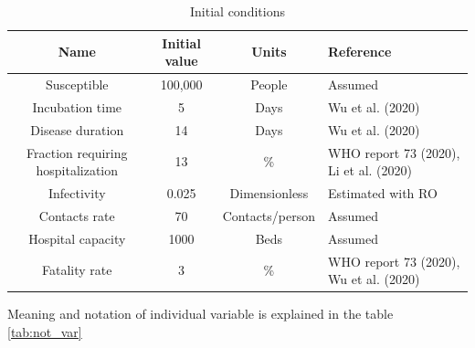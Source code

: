 \documentclass[12pt,a4paper,english]{article}
\begin{document}
    \begin{table}[h!]
        \centering
        \begin{tabularx}{\textwidth}{|c|c|c|X|}
            \hline
            Name & Initial value & Units & Reference \\
            \hline
            Susceptible	                        & 100,000 &	People & Assumed\\
            Incubation time	                    & 5	 &  Days & Wu et al. (2020)\\
            Disease duration                    & 14	&  Days & Wu et al. (2020)\\
            Fraction requiring hospitalization	& 13  & \% & WHO report 73 (2020), Li et al. (2020) \\
            Infectivity	                        & 0.025 & Dimensionless & Estimated with RO \\
            Contacts rate	                    & 70   & Contacts/person & Assumed \\
            Hospital capacity	                & 1000 & Beds & Assumed \\
            Fatality rate	                    & 3	   & \% & WHO report 73 (2020), Wu et al. (2020) \\
            \hline
        \end{tabularx}
        \caption{Initial conditions \cite{math_article}}
        \label{tab:init_vars}
    \end{table}
    
    Meaning and notation of individual variable is explained in the table \ref{tab:not_var}
\end{document}
